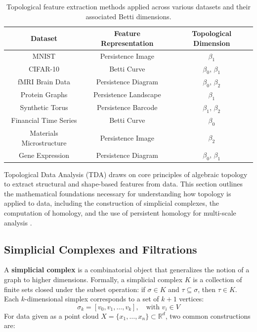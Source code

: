 \documentclass[9pt, twoside, twocolumn]{extarticle}
\begin{document}
    \begin{table}[t]
        \centering
        \begin{tabular}{|c|c|c|}
            \hline
            Dataset & Feature Representation & Topological Dimension \\
            \hline
            MNIST & Persistence Image & $\beta_1$ \\
            CIFAR-10 & Betti Curve & $\beta_0$, $\beta_1$ \\
            fMRI Brain Data & Persistence Diagram & $\beta_0$, $\beta_2$ \\
            Protein Graphs & Persistence Landscape & $\beta_1$ \\
            Synthetic Torus & Persistence Barcode & $\beta_1$, $\beta_2$ \\
            Financial Time Series & Betti Curve & $\beta_0$ \\
            Materials Microstructure & Persistence Image & $\beta_2$ \\
            Gene Expression & Persistence Diagram & $\beta_0$, $\beta_1$ \\
            \hline
        \end{tabular}
        \caption{Topological feature extraction methods applied across various datasets and their associated Betti dimensions.}
        \label{tab:tda_features}
    \end{table}

    Topological Data Analysis (TDA) draws on core principles of algebraic topology to extract structural and shape-based features from data. This section outlines the mathematical foundations necessary for understanding how topology is applied to data, including the construction of simplicial complexes, the computation of homology, and the use of persistent homology for multi-scale analysis \cite{carlsson2009topology, hatcher2002algebraic, chazal2021introduction}.

    \subsection*{Simplicial Complexes and Filtrations}

        A \textbf{simplicial complex} is a combinatorial object that generalizes the notion of a graph to higher dimensions. Formally, a simplicial complex $K$ is a collection of finite sets closed under the subset operation: if $\sigma \in K$ and $\tau \subseteq \sigma$, then $\tau \in K$. Each $k$-dimensional simplex corresponds to a set of $k+1$ vertices:
        \[
        \sigma_k = [v_0, v_1, \dots, v_k], \quad \text{with } v_i \in V
        \]
        For data given as a point cloud $X = \{x_1, \dots, x_n\} \subset \mathbb{R}^d$, two common constructions are:
\end{document}
